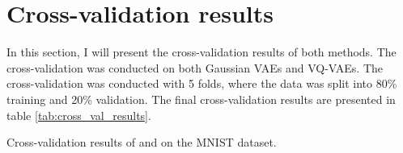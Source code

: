 \section{Cross-validation results}

In this section, I will present the cross-validation results of both methods. The cross-validation was conducted on both Gaussian VAEs and VQ-VAEs. The cross-validation was conducted with 5 folds, where the data was split into 80\% training and 20\% validation.
The final cross-validation results are presented in table \ref{tab:cross_val_results}.

\begin{table}
    
    \caption{Cross-validation results of  and  on the MNIST dataset.}
    \label{tab:cross_val_results}
\end{table}